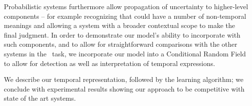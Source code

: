 Probabilistic systems furthermore allow propagation of uncertainty
	to higher-level components -- for example recognizing that  could
	have a number of non-temporal meanings and allowing a system with a broader
	contextual scope to make the final judgment.
In order to demonstrate our model's ability to incorporate with such components,
	and to allow for straightforward comparisons with the other systems in the
	\tempeval\ task, we incorporate our model into a Conditional Random Field
	\cite{key:2001lafferty-crf} to allow for detection as well as interpretation
	of temporal expressions.

We describe our temporal representation,
	followed by the learning algorithm; 
	we conclude with experimental results showing our
	approach to be competitive with state of the art systems.


